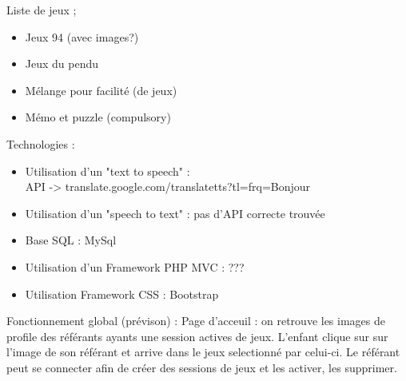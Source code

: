 \documentclass[12pt,a4paper]{report}
\begin{document}
Liste de jeux ;
\begin{itemize}
\item Jeux 94 (avec images?)
\item Jeux du pendu
\item Mélange pour facilité (de jeux)
\item Mémo et puzzle (compulsory)
\end{itemize}

Technologies :
\begin{itemize}
\item Utilisation d'un "text to speech" :\\API -> translate.google.com/translatetts?tl=frq=Bonjour
\item Utilisation d'un "speech to text" : pas d'API correcte trouvée
\item Base SQL : MySql
\item Utilisation d'un Framework PHP MVC : ???
\item Utilisation Framework CSS : Bootstrap
\end{itemize}

Fonctionnement global (prévison) :
Page d'acceuil : on retrouve les images de profile des référants ayants une session actives de jeux. 
L'enfant clique sur sur l'image de son référant et arrive dans le jeux selectionné par celui-ci.
Le référant peut se connecter afin de créer des sessions de jeux et les activer, les supprimer.




\end{document}
